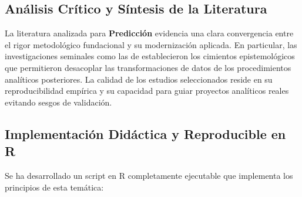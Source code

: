 \subsection{Análisis Crítico y Síntesis de la Literatura}
La literatura analizada para \textbf{Predicción} evidencia una clara convergencia entre el rigor metodológico fundacional y su modernización aplicada. 
En particular, las investigaciones seminales como las de \citeauthor{george} establecieron los cimientos epistemológicos que permitieron desacoplar las transformaciones de datos de los procedimientos analíticos posteriores. 
La calidad de los estudios seleccionados reside en su reproducibilidad empírica y su capacidad para guiar proyectos analíticos reales evitando sesgos de validación.


\subsection{Implementación Didáctica y Reproducible en R}
Se ha desarrollado un script en R completamente ejecutable que implementa los principios de esta temática:

